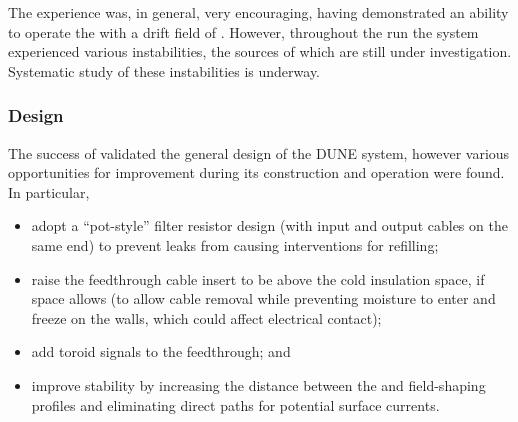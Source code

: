 \label{sec:fdsp-hv-protodune-lessons}
The   experience was, in general, very encouraging, having demonstrated 
an ability to operate the  with a drift field of \spmaxfield{}. %
However, throughout the run the system experienced various instabilities, the sources of which are %
still under investigation.
Systematic study of these instabilities is underway.

\subsubsection{Design}
\label{sec:fdsp-hv-protodune-lessons-design}

The success of  validated the general design of the DUNE  system, however various opportunities for improvement during its construction and operation were found. In particular,

\begin{itemize}
\item adopt a ``pot-style'' filter resistor design (with input and output cables on the same end) %
to prevent leaks from causing interventions for refilling;
\item raise the  feedthrough cable insert to be above the cold insulation space, if space allows (to allow cable removal while preventing moisture to enter and freeze on the walls, which could affect electrical contact);
\item add toroid signals %
to the feedthrough; and
\item improve stability by increasing the distance between the  and field-shaping profiles and eliminating direct paths for potential surface currents.
\end{itemize}


